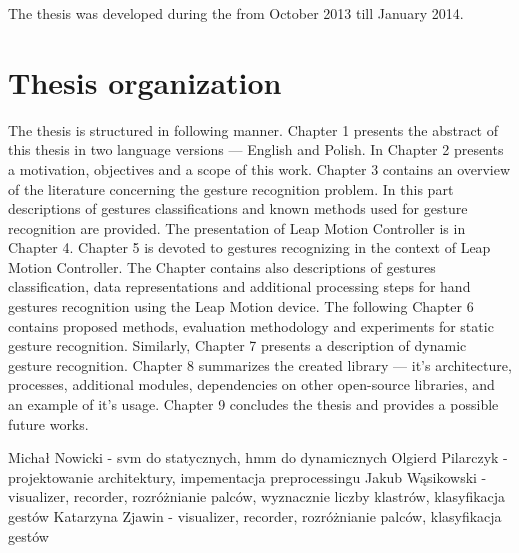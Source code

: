 The thesis was developed during the from October 2013 till January 2014.


\section{Thesis organization}
The thesis is structured in following manner. 
Chapter 1 presents the abstract of this thesis in two language versions --- English and Polish. 
In Chapter 2 presents a motivation, objectives and a scope of this work. 
Chapter 3 contains an overview of the literature concerning the gesture recognition problem. 
In this part descriptions of gestures classifications and known methods used for gesture recognition are provided. 
The presentation of Leap Motion Controller is in Chapter 4. Chapter 5 is devoted to gestures recognizing in the context of Leap Motion Controller.
The Chapter contains also descriptions of gestures classification, data representations and additional processing steps for hand gestures recognition using the Leap Motion device. 
The following Chapter 6 contains proposed methods, evaluation methodology and experiments for static gesture recognition. 
Similarly, Chapter 7 presents a description of dynamic gesture recognition. 
Chapter 8 summarizes the created library --- it's architecture, processes, additional modules, dependencies on other open-source libraries, and an example of it's usage. 
Chapter 9 concludes the thesis and provides a possible future works. 

{\color{red} Michał Nowicki - svm do statycznych, hmm do dynamicznych
Olgierd Pilarczyk - projektowanie architektury, impementacja preprocessingu
Jakub Wąsikowski - visualizer, recorder, rozróżnianie palców, wyznacznie liczby klastrów, klasyfikacja gestów
Katarzyna Zjawin - visualizer, recorder, rozróżnianie palców, klasyfikacja gestów}


